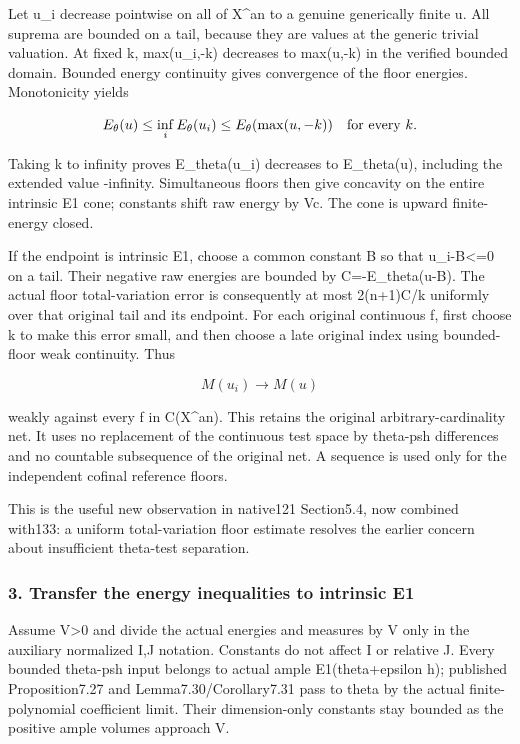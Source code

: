 \documentclass[
]{article}
\begin{document}
Let u\_i decrease pointwise on all of X\^{}an to a genuine generically
finite u. All suprema are bounded on a tail, because they are values at
the generic trivial valuation. At fixed k, max(u\_i,-k) decreases to
max(u,-k) in the verified bounded domain. Bounded energy continuity
gives convergence of the floor energies. Monotonicity yields

\[E_\theta(u)\le\inf_i E_\theta(u_i)
\le E_\theta(\max(u,-k))\quad\hbox{for every }k.\]

Taking k to infinity proves E\_theta(u\_i) decreases to E\_theta(u),
including the extended value -infinity. Simultaneous floors then give
concavity on the entire intrinsic E1 cone; constants shift raw energy by
Vc. The cone is upward finite-energy closed.

If the endpoint is intrinsic E1, choose a common constant B so that
u\_i-B\textless=0 on a tail. Their negative raw energies are bounded by
C=-E\_theta(u-B). The actual floor total-variation error is consequently
at most 2(n+1)C/k uniformly over that original tail and its endpoint.
For each original continuous f, first choose k to make this error small,
and then choose a late original index using bounded-floor weak
continuity. Thus

\[M(u_i)\longrightarrow M(u)\]

weakly against every f in C(X\^{}an). This retains the original
arbitrary-cardinality net. It uses no replacement of the continuous test
space by theta-psh differences and no countable subsequence of the
original net. A sequence is used only for the independent cofinal
reference floors.

This is the useful new observation in native121 Section5.4, now combined
with133: a uniform total-variation floor estimate resolves the earlier
concern about insufficient theta-test separation.

\subsubsection{3. Transfer the energy inequalities to intrinsic
E1}\label{transfer-the-energy-inequalities-to-intrinsic-e1}

Assume V\textgreater0 and divide the actual energies and measures by V
only in the auxiliary normalized I,J notation. Constants do not affect I
or relative J. Every bounded theta-psh input belongs to actual ample
E1(theta+epsilon h); published Proposition7.27 and
Lemma7.30/Corollary7.31 pass to theta by the actual finite-polynomial
coefficient limit. Their dimension-only constants stay bounded as the
positive ample volumes approach V.
\end{document}
